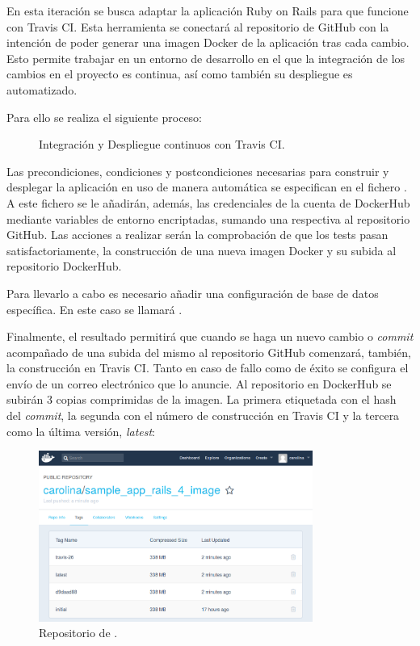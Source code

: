 En esta iteración se busca adaptar la aplicación Ruby on Rails para que funcione con Travis CI. Esta herramienta se conectará al repositorio de GitHub  con la intención de poder generar una imagen Docker de la aplicación tras cada cambio. Esto permite trabajar en un entorno de desarrollo en el que la integración de los cambios en el proyecto es continua, así como también su despliegue es automatizado.

Para ello se realiza el siguiente proceso:
\begin{figure}[H]
\caption{Integración y Despliegue continuos con Travis CI.}
\end{figure}

Las precondiciones, condiciones y postcondiciones necesarias para construir y desplegar la aplicación en uso de manera automática se especifican en el fichero . A este fichero se le añadirán, además, las credenciales de la cuenta de DockerHub mediante variables de entorno encriptadas, sumando una respectiva al repositorio GitHub. Las acciones a realizar serán la comprobación de que los tests pasan satisfactoriamente, la construcción de una nueva imagen Docker y su subida al repositorio DockerHub.

Para llevarlo a cabo es necesario añadir una configuración de base de datos específica. En este caso se llamará .

Finalmente, el resultado permitirá que cuando se haga un nuevo cambio o \textit{commit} acompañado de una subida del mismo al repositorio GitHub comenzará, también, la construcción en Travis CI. Tanto en caso de fallo como de éxito se configura el envío de un correo electrónico que lo anuncie. Al repositorio en DockerHub se subirán 3 copias comprimidas de la imagen. La primera etiquetada con el hash del \textit{commit}, la segunda con el número de construcción en Travis CI y la tercera como la última versión, \textit{latest}:

\begin{figure}[H]
\centering
\includegraphics[width=0.8\textwidth]{images/figures/dockerhubimages.png}
\caption{Repositorio de .\label{fig:dockerhub_images}}
\end{figure}

